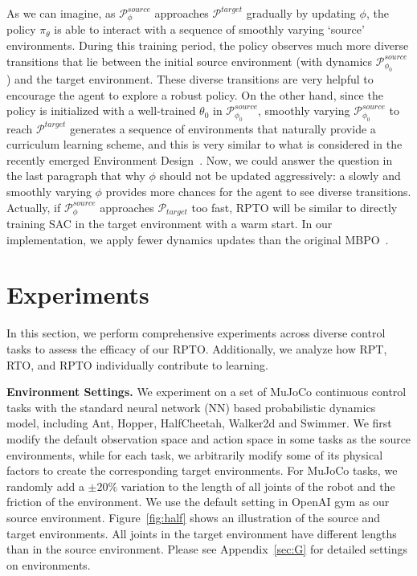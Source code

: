\documentclass[letterpaper]{article} %
\def\P{{\mathcal{P}}}
\begin{document}
As we can imagine, as $\P_{\phi}^{source}$ approaches $\P^{target}$ gradually by updating $\phi$, the policy $\pi_{\theta}$ is able to interact with a sequence of smoothly varying `source' environments. During this training period, the policy observes much more diverse transitions that lie between the initial source environment (with dynamics $\P_{\phi_0}^{source}$) and the target environment. These diverse transitions are very helpful to encourage the agent to explore a robust policy. On the other hand, since the policy is initialized with a well-trained $\theta_0$ in $\P_{\phi_0}^{source}$, smoothly varying $\P_{\phi_0}^{source}$ to reach $\P^{target}$ generates a sequence of environments that naturally provide a curriculum learning scheme, and this is very similar to what is considered in the recently emerged Environment Design~\citep{dennis2020emergent}. Now, we could answer the question in the last paragraph that why $\phi$ should not be updated aggressively: a slowly and smoothly varying $\phi$ provides more chances for the agent to see diverse transitions. Actually, if $\P_{\phi}^{source}$ approaches $\P_{target}$ too fast, RPTO will be similar to directly training SAC in the target environment with a warm start. 
In our implementation, we apply fewer dynamics updates than the original MBPO~\cite{janner2019trust}.





\section{Experiments}

In this section, we perform comprehensive experiments across diverse control tasks to assess the efficacy of our RPTO. Additionally, we analyze how RPT, RTO, and RPTO individually contribute to learning.


\textbf{Environment Settings.}
We experiment on a set of MuJoCo continuous control tasks with the standard neural network (NN) based probabilistic dynamics model, including Ant, Hopper, HalfCheetah, Walker2d and Swimmer.
We first modify the default observation space and action space in some tasks as the source environments,
while for each task, we arbitrarily modify some of its physical factors to create the corresponding target environments. 
For MuJoCo tasks, we randomly add a $\pm20\%$ variation to the length of all joints of the robot and the friction of the environment. 
We use the default setting in OpenAI gym as our source environment.
Figure~\ref{fig:half} shows an illustration of the source and target environments.
All joints in the target environment have different lengths than in the source environment.
Please see Appendix~\ref{sec:G} for detailed settings on environments.
\end{document}
